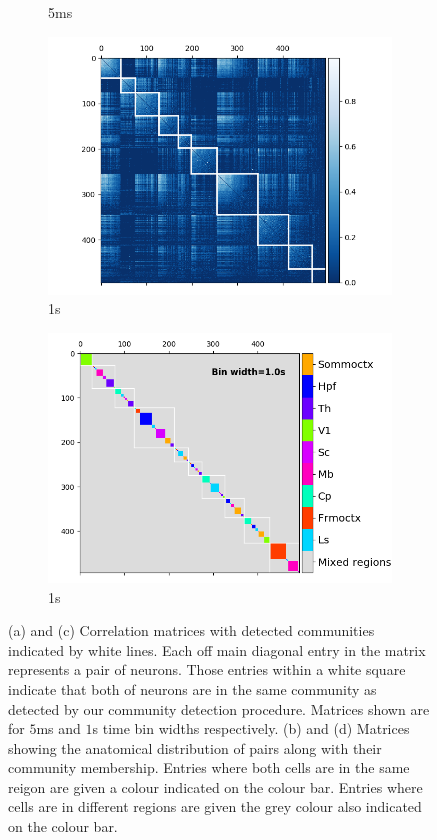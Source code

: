 \documentclass[a4paper,12pt]{article}
\theoremstyle{definition}
\begin{document}
\begin{figure}
\begin{subfigure}[h]{0.5\linewidth}
      \caption{5ms}
      \label{fig:regional_cluster_map_5ms}
    \end{subfigure}
    \begin{subfigure}[h]{0.5\linewidth}
      \includegraphics[width=\linewidth]{figures/Krebs_1p0_rectified_cons_cluster_map.png}
      \caption{1s}
      \label{fig:consensus_cluster_1s}
    \end{subfigure}
    \begin{subfigure}[h]{0.5\linewidth}
      \includegraphics[width=\linewidth]{figures/Krebs_1p0_regional_cluster_map.png}
      \caption{1s}
      \label{fig:regional_cluster_map_1s}
    \end{subfigure}
    \caption{(a) and (c) Correlation matrices with detected communities indicated by white lines. Each off main diagonal entry in the matrix represents a pair of neurons. Those entries within a white square indicate that both of neurons are in the same community as detected by our community detection procedure. Matrices shown are for $5$ms and $1$s time bin widths respectively. (b) and (d) Matrices showing the anatomical distribution of pairs along with their community membership. Entries where both cells are in the same reigon are given a colour indicated on the colour bar. Entries where cells are in different regions are given the grey colour also indicated on the colour bar.}

\end{figure}
\end{document}
